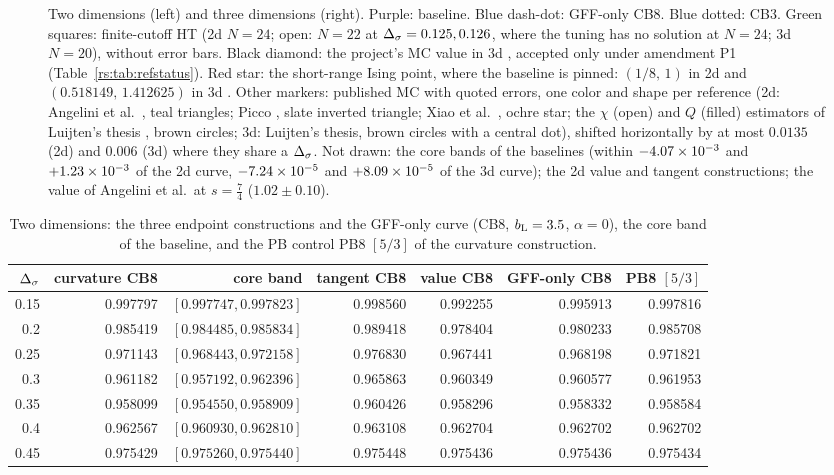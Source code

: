 \begin{figure}[htbp]\centering
{}
\caption{Two dimensions (left) and three dimensions (right). Purple: baseline. Blue
dash-dot: GFF-only CB8. Blue dotted: CB3. Green squares: finite-cutoff HT \cite{rs:noteHT} (2d
$N=24$; open: $N=22$ at $\Delta_\sigma=0.125,0.126$, where the tuning has no solution at $N=24$; 3d
$N=20$), without error bars. Black diamond: the project's MC value in 3d \cite{rs:noteMC},
accepted only under amendment P1 (Table~\ref{rs:tab:refstatus}). Red star: the short-range
Ising point, where the baseline is pinned: $(1/8,\,1)$ in 2d and $(0.518149,\,1.412625)$ in 3d
\cite{rs:Chang:2024whx}. Other markers: published MC with quoted errors, one color and shape per
reference (2d: Angelini et al.\ \cite{rs:Angelini:2014koy}, teal triangles; Picco \cite{rs:Picco:2012ak},
slate inverted triangle; Xiao et al.\ \cite{rs:Xiao:2025sk}, ochre star; the $\chi$ (open) and $Q$
(filled) estimators of Luijten's thesis \cite{rs:Luijten:1997th}, brown circles; 3d: Luijten's thesis,
brown circles with a central dot), shifted horizontally by at
most $0.0135$ (2d) and $0.006$ (3d) where they share a $\Delta_\sigma$. Not drawn: the core bands of the
baselines (within $-4.07\times10^{-3}$ and $+1.23\times10^{-3}$ of the 2d curve, $-7.24\times10^{-5}$
and $+8.09\times10^{-5}$ of the 3d curve); the 2d value and tangent constructions; the value of
Angelini et al.\ at $s=\frac74$ ($1.02\pm0.10$).}
\label{rs:fig:curves23}
\end{figure}

\begin{table}[htbp]\centering\small
\begin{tabular}{@{}r r r r r r r@{}}
\toprule
$\Delta_\sigma$ & curvature CB8 & core band & tangent CB8 & value CB8 & GFF-only CB8 & PB8 $[5/3]$\\ \midrule
0.15 & 0.997797 & $[0.997747,0.997823]$ & 0.998560 & 0.992255 & 0.995913 & 0.997816\\
0.2 & 0.985419 & $[0.984485,0.985834]$ & 0.989418 & 0.978404 & 0.980233 & 0.985708\\
0.25 & 0.971143 & $[0.968443,0.972158]$ & 0.976830 & 0.967441 & 0.968198 & 0.971821\\
0.3 & 0.961182 & $[0.957192,0.962396]$ & 0.965863 & 0.960349 & 0.960577 & 0.961953\\
0.35 & 0.958099 & $[0.954550,0.958909]$ & 0.960426 & 0.958296 & 0.958332 & 0.958584\\
0.4 & 0.962567 & $[0.960930,0.962810]$ & 0.963108 & 0.962704 & 0.962702 & 0.962702\\
0.45 & 0.975429 & $[0.975260,0.975440]$ & 0.975448 & 0.975436 & 0.975436 & 0.975434\\
\bottomrule
\end{tabular}
\caption{Two dimensions: the three endpoint constructions and the GFF-only curve (CB8,
$b_{\mathrm L}=3.5$, $\alpha=0$), the core band of the baseline, and the PB control PB8 $[5/3]$ of the
curvature construction.}
\label{rs:tab:res2d}
\end{table}

